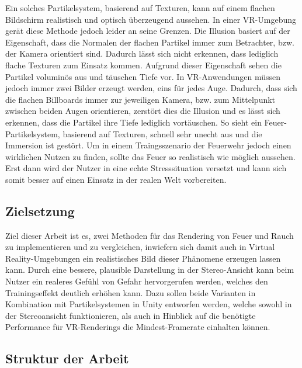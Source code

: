 Ein solches Partikelsystem, basierend auf Texturen, kann auf einem flachen Bildschirm realistisch
und optisch überzeugend aussehen. In einer VR-Umgebung gerät diese Methode jedoch leider an seine Grenzen.
Die Illusion basiert auf der Eigenschaft, dass die Normalen der flachen Partikel immer zum Betrachter, bzw. der Kamera
orientiert sind. Dadurch lässt sich nicht erkennen, dass lediglich flache Texturen zum Einsatz kommen.
Aufgrund dieser Eigenschaft sehen die Partikel voluminös aus und täuschen Tiefe vor.
In VR-Anwendungen müssen jedoch immer zwei Bilder erzeugt werden, eins für jedes Auge.
Dadurch, dass sich die flachen Billboards immer zur jeweiligen Kamera, bzw. zum Mittelpunkt
zwischen beiden Augen orientieren, zerstört dies die Illusion und es lässt sich erkennen, dass
die Partikel ihre Tiefe lediglich vortäuschen. So sieht ein Feuer-Partikelsystem, basierend auf Texturen,
schnell sehr unecht aus und die Immersion ist gestört.
Um in einem Traingsszenario der Feuerwehr jedoch einen wirklichen Nutzen zu finden, sollte das Feuer
so realistisch wie möglich aussehen. Erst dann wird der Nutzer in eine echte Stresssituation versetzt
und kann sich somit besser auf einen Einsatz in der realen Welt vorbereiten.

\subsection{Zielsetzung}

Ziel dieser Arbeit ist es, zwei Methoden für das Rendering von Feuer und Rauch zu implementieren und zu vergleichen, 
inwiefern sich damit auch in Virtual Reality-Umgebungen ein realistisches Bild dieser Phänomene erzeugen lassen kann. 
Durch eine bessere, plausible Darstellung in der 
Stereo-Ansicht kann beim Nutzer ein realeres Gefühl von Gefahr hervorgerufen werden, welches den Trainingseffekt 
deutlich erhöhen kann. Dazu sollen beide Varianten in Kombination mit Partikelsystemen in Unity entworfen werden, 
welche sowohl in der Stereoansicht funktionieren, als auch in Hinblick auf die benötigte Performance für VR-Renderings die 
Mindest-Framerate einhalten können. 


\subsection{Struktur der Arbeit}

